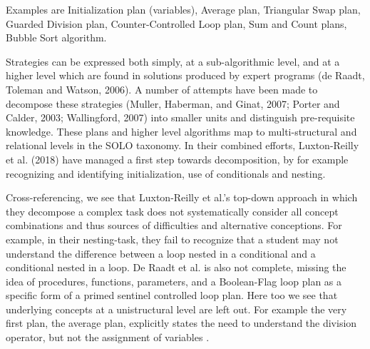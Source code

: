 Examples are Initialization plan (variables), Average plan, Triangular Swap plan, Guarded Division plan, Counter-Controlled Loop plan, Sum and Count plans, Bubble Sort algorithm.

Strategies can be expressed both simply, at a sub-algorithmic level, and at a higher level which are found in solutions produced by expert programs (de Raadt, Toleman and Watson, 2006). A number of attempts have been made to decompose these strategies (Muller, Haberman, and Ginat, 2007; Porter and Calder, 2003; Wallingford, 2007) into  smaller units and distinguish pre-requisite knowledge. These plans and higher level algorithms map to multi-structural and relational levels in the SOLO taxonomy. In their combined efforts, Luxton-Reilly et al. (2018) have managed a first step towards decomposition, by for example recognizing and identifying initialization, use of conditionals and nesting.  




Cross-referencing, we see that Luxton-Reilly et al.’s top-down approach in which they decompose a complex task does not systematically consider all concept combinations and thus sources of difficulties and alternative conceptions. For example, in their nesting-task, they fail to recognize that a student may not understand the difference between a loop nested in a conditional and a conditional nested in a loop. De Raadt et al. is also not complete, missing the idea of procedures, functions, parameters, and a Boolean-Flag loop plan as a specific form of a primed sentinel controlled loop plan. Here too we see that underlying concepts at a unistructural level are left out. For  example the very first plan, the average plan, explicitly states the need to understand the division operator, but not the assignment of variables .

